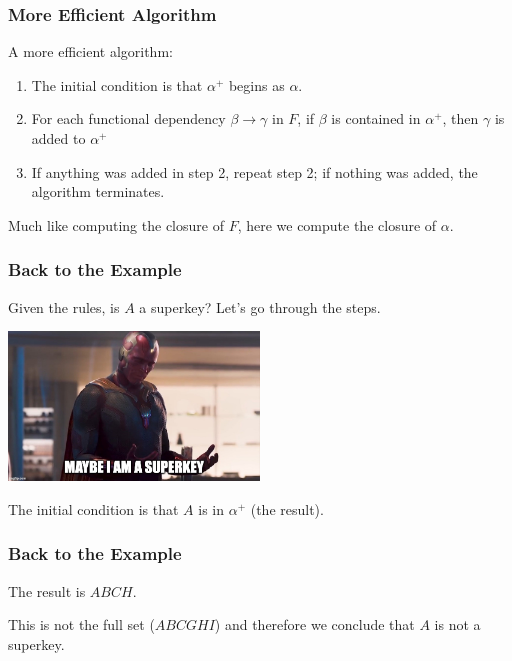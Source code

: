 \begin{frame}
\frametitle{More Efficient Algorithm}

A more efficient algorithm:

\begin{enumerate}
	\item The initial condition is that $\alpha^{+}$ begins as $\alpha$.
	\item For each functional dependency $\beta \rightarrow \gamma$ in $F$,
		if $\beta$ is contained in $\alpha^{+}$, then $\gamma$ is added to $\alpha^{+}$
	\item If anything was added in step 2, repeat step 2; if nothing was added, the algorithm terminates.
\end{enumerate}

Much like computing the closure of $F$, here we compute the closure of $\alpha$. 

\end{frame}



\begin{frame}
\frametitle{Back to the Example}

Given the rules, is $A$ a superkey? Let's go through the steps. 

\begin{center}
	\includegraphics[width=0.5\textwidth]{images/superkey.jpg}
\end{center}

The initial condition is that $A$ is in $\alpha^{+}$ (the result). 

\end{frame}



\begin{frame}
\frametitle{Back to the Example}

The result is $ABCH$. 

This is not the full set ($ABCGHI$) and therefore we conclude that $A$ is not a superkey.

\end{frame}



